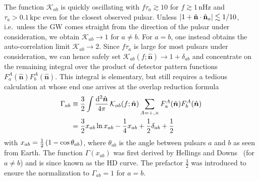 The function $\mathcal{K}_{ab}$ is quickly oscillating with $f \tau_a \gtrsim 10$ for $f \gtrsim 1 \, \text{nHz}$ and $\tau_a > 0.1 \, \text{kpc}$ even for the closest observed pulsar. Unless $\lvert1 + \hat{\mathbf{n}} \cdot \hat{\mathbf{n}}_{a} \rvert \lesssim 1/10$, i.e.~unless the \ac{GW} comes straight from the direction of the pulsar under consideration, we obtain $\mathcal{K}_{ab} \rightarrow 1$ for $a \neq b$. For $a = b$, one instead obtains the auto-correlation limit $\mathcal{K}_{ab} \rightarrow 2$.    Since $f \tau_a$ is large for most pulsars under consideration, we can hence safely set  $\mathcal{K}_{ab}(f; \hat{\bm{n}}) \rightarrow 1 + \delta_{ab}$ and concentrate on the remaining integral over the product of detector pattern functions $F_{a}^{A}(\hat{\bm{n}}) F_{b}^{A}(\hat{\bm{n}})$. This integral is elementary, but still requires a tedious calculation at whose end one arrives at the overlap reduction formula
\begin{align}
	 \Gamma_{ab} &\equiv \frac{3}{2} \int \frac{\mathop{}\!\mathrm{d}^{2} \hat{\bm{n}}}{4 \pi} \, \mathcal{K}_{a b}(f ; \hat{\bm{n}})  \sum_{A=+, \times} F_{a}^{A}(\hat{\bm{n}}) F_{b}^{A}(\hat{\bm{n}}) \\
	 &=\frac{3}{2} x_{ab} \ln x_{ab} - \frac{1}{4} x_{ab}  + \frac{1}{2} \delta_{ab} + \frac{1}{2} \label{eq:HD}
\end{align}
with $x_{ab} = \frac{1}{2} \left( 1 - \cos \theta_{a b} \right)$, where $\theta_{a b}$ is the angle between pulsars $a$ and $b$ as seen from Earth. The function $\Gamma(x_{ab})$ was first  derived by Hellings and Downs~\cite{Hellings:1983fr} (for $a \neq b$) and is since known as the \ac{HD} curve. The prefactor $\frac{3}{2}$ was introduced to ensure the normalization to $\Gamma_{ab} = 1$ for $a = b$.

